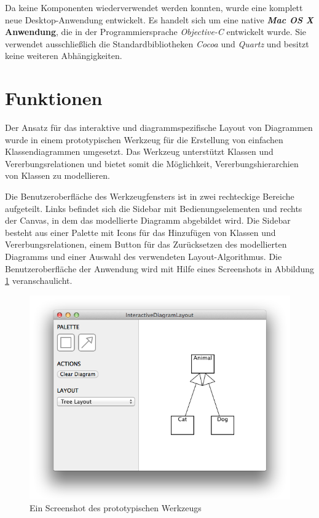Da keine Komponenten wiederverwendet werden konnten, wurde eine komplett neue Desktop-Anwendung entwickelt. Es handelt sich um eine native \textbf{\textit{Mac OS X} Anwendung}, die in der Programmiersprache \textit{Objective-C} entwickelt wurde. Sie verwendet ausschließlich die Standardbibliotheken \textit{Cocoa} und \textit{Quartz} und besitzt keine weiteren Abhängigkeiten.

\section{Funktionen}
\label{sec:functions}

Der Ansatz für das interaktive und diagrammspezifische Layout von Diagrammen wurde in einem prototypischen Werkzeug für die Erstellung von einfachen Klassendiagrammen umgesetzt. Das Werkzeug unterstützt Klassen und Vererbungsrelationen und bietet somit die Möglichkeit, Vererbungshierarchien von Klassen zu modellieren.

Die Benutzeroberfläche des Werkzeugfensters ist in zwei rechteckige Bereiche aufgeteilt. Links befindet sich die Sidebar mit Bedienungselementen und rechts der Canvas, in dem das modellierte Diagramm abgebildet wird. Die Sidebar besteht aus einer Palette mit Icons für das Hinzufügen von Klassen und Vererbungsrelationen, einem Button für das Zurücksetzen des modellierten Diagramms und einer Auswahl des verwendeten Layout-Algorithmus. Die Benutzeroberfläche der Anwendung wird mit Hilfe eines Screenshots in Abbildung \ref{fig:prototype-screenshot} veranschaulicht.

\begin{figure}[hbt]
    \centering
    \includegraphics[scale=0.6]{assets/prototype-screenshot}
    \caption{Ein Screenshot des prototypischen Werkzeugs}
    \label{fig:prototype-screenshot}
\end{figure}

